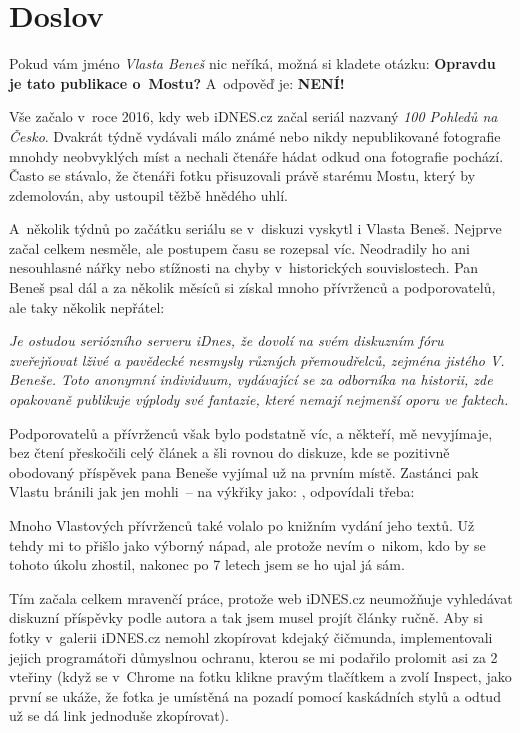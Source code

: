 \chapter{Doslov}

Pokud vám jméno {\em Vlasta Beneš} nic neříká, možná si kladete otázku: {\bf Opravdu je
tato publikace o~Mostu?} A~odpověď je: {\bf NENÍ!}

Vše začalo v~roce 2016, kdy web iDNES.cz začal seriál nazvaný {\em 100 Pohledů
na Česko}. Dvakrát týdně vydávali málo známé nebo nikdy nepublikované
fotografie mnohdy neobvyklých míst a nechali čtenáře hádat odkud ona fotografie
pochází. Často se stávalo, že čtenáři fotku přisuzovali právě starému Mostu,
který by zdemolován, aby ustoupil těžbě hnědého uhlí.

A~několik týdnů po začátku seriálu se v~diskuzi vyskytl i Vlasta Beneš. Nejprve
začal celkem nesměle, ale postupem času se rozepsal víc. Neodradily ho ani
nesouhlasné nářky  nebo stížnosti na chyby v~historických souvislostech. Pan
Beneš psal dál a za několik měsíců si získal mnoho přívrženců a podporovatelů,
ale taky několik nepřátel:

{\it Je ostudou seriózního serveru iDnes, že dovolí na svém diskuzním fóru
zveřejňovat lživé a pavědecké nesmysly různých přemoudřelců, zejména jistého V.
Beneše. Toto anonymní individuum, vydávající se za odborníka na historii, zde
opakovaně publikuje výplody své fantazie, které nemají nejmenší oporu ve
faktech.}

Podporovatelů a přívrženců však bylo podstatně víc, a někteří, mě nevyjímaje,
bez čtení přeskočili celý článek a šli rovnou do diskuze, kde se pozitivně
obodovaný příspěvek pana Beneše vyjímal už na prvním místě. Zastánci pak Vlastu
bránili jak jen mohli~-- na výkřiky jako: , odpovídali třeba: 

Mnoho Vlastových přívrženců také volalo po knižním vydání jeho textů. Už tehdy
mi to přišlo jako výborný nápad, ale protože nevím o~nikom, kdo by se tohoto
úkolu zhostil, nakonec po 7 letech jsem se ho ujal já sám.

Tím začala celkem mravenčí práce, protože web iDNES.cz neumožňuje vyhledávat
diskuzní příspěvky podle autora a tak jsem musel projít články ručně. Aby si
fotky v~galerii iDNES.cz nemohl zkopírovat kdejaký čičmunda, implementovali
jejich programátoři důmyslnou ochranu, kterou se mi podařilo prolomit asi za 2
vteřiny (když se v~Chrome na fotku klikne pravým tlačítkem a zvolí Inspect,
jako první se ukáže, že fotka je umístěná na pozadí pomocí kaskádních stylů a
odtud už se dá link jednoduše zkopírovat).

